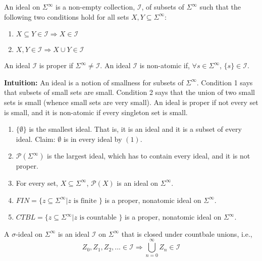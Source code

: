 \documentclass[../main.tex]{subfiles}
\begin{document}
\begin{defn}
    An ideal on $\Sigma^{\infty}$ is a non-empty collection, $\mathscr{I}$, of
    subsets of $\Sigma^{\infty}$ such that the following two conditions hold
    for all sets $X, Y \subseteq \Sigma^{\infty}$:
    \begin{enumerate}
        \item $X \subseteq Y \in \mathscr{I} \Rightarrow X \in \mathscr{I}$
        \item $X, Y \in \mathscr{I} \Rightarrow X \cup Y \in \mathscr{I}$
    \end{enumerate}
\end{defn}

An ideal $\mathscr{I}$ is proper if $\Sigma^{\infty} \neq \mathscr{I}$. An ideal
$\mathscr{I}$ is non-atomic if, $\forall s \in \Sigma^{\infty}$,
$\{s\} \in \mathscr{I}$.

\textbf{Intuition:}
An ideal is a notion of smallness for subsets of $\Sigma^{\infty}$. Condition 1
says that subsets of small sets are small. Condition 2 says that the union
of two small sets is small (whence small sets are very small). An ideal is proper
if not every set is small, and it is non-atomic if every singleton set is small.

\begin{exmp}
    \begin{enumerate}
        \item $\{ \emptyset \}$ is the smallest ideal. That is, it is an ideal
            and it is a subset of every ideal. Claim: $\emptyset$ is in every
            ideal by $(1)$.
        \item $\mathscr{P}(\Sigma^{\infty})$ is the largest ideal, which has to
            contain every ideal, and it is not proper.
        \item For every set, $X \subseteq \Sigma^{\infty}$, $\mathscr{P}(X)$ is
            an ideal on $\Sigma^{\infty}$.
        \item $FIN = \{ z \subseteq \Sigma^{\infty} | z \text{ is finite } \}$
            is a proper, nonatomic ideal on $\Sigma^{\infty}$.
        \item $CTBL = \{ z \subseteq \Sigma^{\infty} | z \text{ is countable } \}$
            is a proper, nonatomic ideal on $\Sigma^{\infty}$.
    \end{enumerate}
\end{exmp}

\begin{defn}
    A $\sigma$-ideal on $\Sigma^{\infty}$ is an ideal $\mathscr{I}$ on
    $\Sigma^{\infty}$ that is closed under countbale unions, i.e.,
    \begin{equation*}
        Z_0, Z_1, Z_2, ... \in \mathscr{I} \Rightarrow \bigcup\limits_{n=0}^{\infty} Z_n \in \mathscr{I}
    \end{equation*}
\end{defn}
\end{document}
